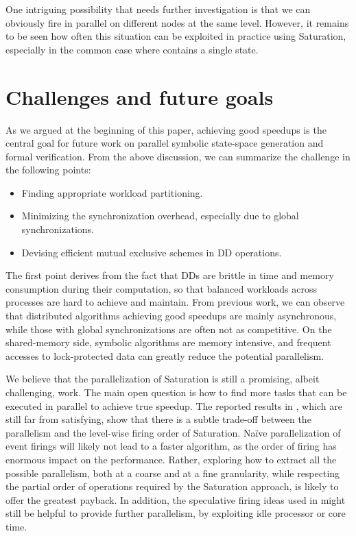 \documentclass[copyright,creativecommons]{eptcs}
\begin{document}
One intriguing possibility that needs further investigation is that we
can obviously fire in parallel on different nodes at the same level.
However, it remains to be seen how often this situation can be exploited
in practice using Saturation, especially in the common case where
 contains a single state.




\section{Challenges and future goals}
\label{sec:challenge}

As we argued at the beginning of this paper, achieving good speedups
is the central goal for future work on parallel symbolic state-space
generation and formal verification.
From the above discussion, we can summarize the challenge in
the following points:
\begin{itemize}
\item Finding appropriate workload partitioning.
\item Minimizing the synchronization overhead, especially due to
      global synchronizations.
\item Devising efficient mutual exclusive schemes in DD operations.
\end{itemize}
The first point derives from the fact that DDs are brittle
in time and memory consumption during their computation, so that
balanced workloads across processes are hard to achieve and maintain.
From previous work, we can observe that distributed algorithms achieving
good speedups are mainly asynchronous, while those with global
synchronizations are often not as competitive.
On the shared-memory side,
symbolic algorithms are memory intensive, and frequent accesses to
lock-protected data can greatly reduce the potential parallelism.

We believe that the parallelization of Saturation is still a promising,
albeit challenging, work.
The main open question is how to find more tasks that
can be executed in parallel to achieve true speedup.
The reported results in \cite{2007CAV-Cilk}, which are still far from
satisfying, show that there is a subtle trade-off between the
parallelism and the level-wise firing order of Saturation.
Na\"ive parallelization of event firings will likely not lead to a faster
algorithm, as the order of firing has enormous impact on the performance.
Rather, exploring how to extract all the possible parallelism, both
at a coarse and at a fine granularity, while respecting the partial
order of operations required by the Saturation approach, is likely
to offer the greatest payback.
In addition, the speculative firing ideas used in
\cite{2005PDMC-FirePredict,2006IPDPS-Speculative,2009JLC-ImageSpeculation}
might still be helpful to provide further parallelism,
by exploiting idle processor or core time.
\end{document}
